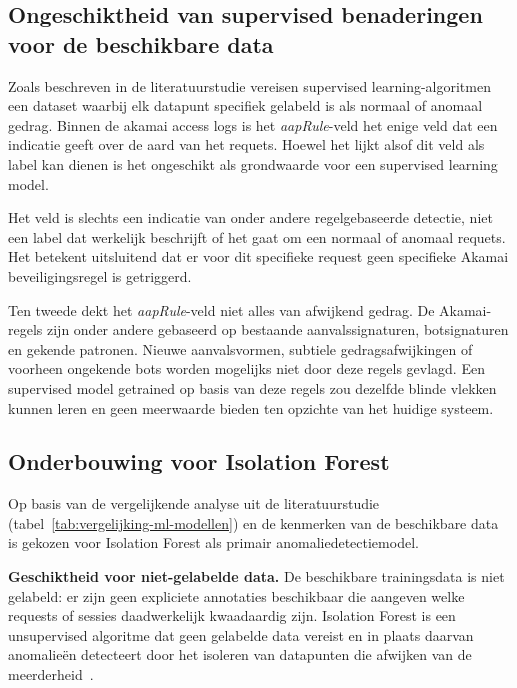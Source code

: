 \subsection{Ongeschiktheid van supervised benaderingen voor de beschikbare data}
\label{subsec:ongeschiktheid-supervised}

Zoals beschreven in de literatuurstudie vereisen supervised learning-algoritmen een dataset waarbij elk datapunt specifiek gelabeld is als normaal of anomaal gedrag. Binnen de akamai access logs is het \textit{aapRule}-veld het enige veld dat een indicatie geeft over de aard van het requets. Hoewel het lijkt alsof dit veld als label kan dienen is het ongeschikt als grondwaarde voor een supervised learning model. 

Het veld is slechts een indicatie van onder andere regelgebaseerde detectie, niet een label dat werkelijk beschrijft of het gaat om een normaal of anomaal requets. Het betekent uitsluitend dat er voor dit specifieke request geen specifieke Akamai beveiligingsregel is getriggerd. 

Ten tweede dekt het \textit{aapRule}-veld niet alles van afwijkend gedrag. De Akamai-regels zijn onder andere gebaseerd op bestaande aanvalssignaturen, botsignaturen en gekende patronen. Nieuwe aanvalsvormen, subtiele gedragsafwijkingen of voorheen ongekende bots worden mogelijks niet door deze regels gevlagd. Een supervised model getrained op basis van deze regels zou dezelfde blinde vlekken kunnen leren en geen meerwaarde bieden ten opzichte van het huidige systeem. 

\subsection{Onderbouwing voor Isolation Forest} 
\label{subsec:onderbouwing-isolation-forest}

Op basis van de vergelijkende analyse uit de literatuurstudie (tabel~\ref{tab:vergelijking-ml-modellen}) en de kenmerken van de beschikbare data is gekozen voor Isolation Forest als primair anomaliedetectiemodel. 

\textbf{Geschiktheid voor niet-gelabelde data.} De beschikbare trainingsdata is niet gelabeld: er zijn geen expliciete annotaties beschikbaar die aangeven welke requests of sessies daadwerkelijk kwaadaardig zijn. Isolation Forest is een unsupervised algoritme dat geen gelabelde data vereist en in plaats daarvan anomalieën detecteert door het isoleren van datapunten die afwijken van de meerderheid~\autocite{Liu2008}.

